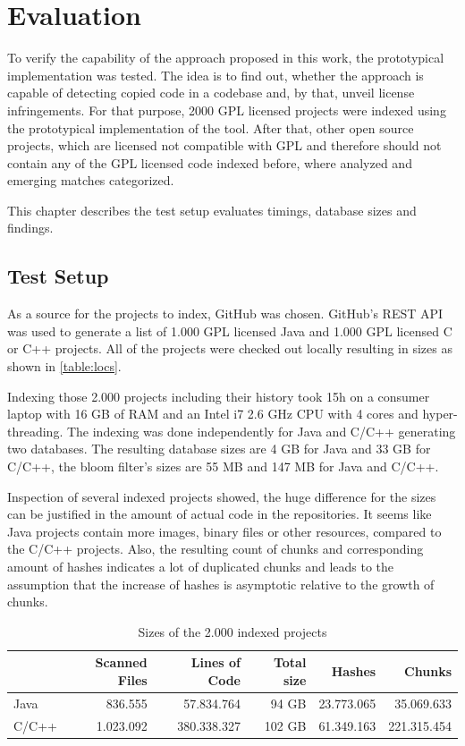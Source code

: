 
\chapter{Evaluation}\label{chapter:evaluation}
To verify the capability of the approach proposed in this work, the prototypical implementation was tested.
The idea is to find out, whether the approach is capable of detecting copied code in a codebase and, by that, unveil license infringements.
For that purpose, 2000 GPL licensed projects were indexed using the prototypical implementation of the tool.
After that, other open source projects, which are licensed not compatible with GPL and therefore should not contain any of the GPL licensed code indexed before, where analyzed and emerging matches categorized.

This chapter describes the test setup evaluates timings, database sizes and findings.

\section{Test Setup}
As a source for the projects to index, GitHub was chosen.
GitHub's REST API was used to generate a list of 1.000 GPL licensed Java and 1.000 GPL licensed C or C++ projects.
All of the projects were checked out locally resulting in sizes as shown in \autoref{table:locs}.

Indexing those 2.000 projects including their history took 15h on a consumer laptop with 16 GB of RAM and an Intel i7 2.6 GHz CPU with 4 cores and hyper-threading.
The indexing was done independently for Java and C/C++ generating two databases.
The resulting database sizes are 4 GB for Java and 33 GB for C/C++, the bloom filter's sizes are 55 MB and 147 MB for Java and C/C++.

Inspection of several indexed projects showed, the huge difference for the sizes can be justified in the amount of actual code in the repositories.
It seems like Java projects contain more images, binary files or other resources, compared to the C/C++ projects.
Also, the resulting count of chunks and corresponding amount of hashes indicates a lot of duplicated chunks and leads to the assumption that the increase of hashes is asymptotic relative to the growth of chunks.

\begin{table}[ht]
	\centering
	\begin{tabular}{l|rrrrr}
		& \textbf{Scanned Files} & \textbf{Lines of Code} & \textbf{Total size} & \textbf{Hashes} & \textbf{Chunks} \\ 
		\hline 
		Java & 836.555 & 57.834.764 & 94 GB & 23.773.065 & 35.069.633 \\
		C/C++ & 1.023.092 & 380.338.327 & 102 GB & 61.349.163 & 221.315.454 \\ 
	\end{tabular}
	\caption{Sizes of the 2.000 indexed projects}\label{table:locs}
\end{table}

